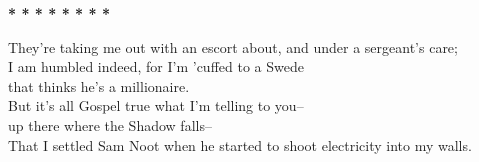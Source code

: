 \begin{poemblock}
\centerline{\textbf{*   *   *   *   *   *   *   *}}

They're taking me out with an escort about, and under a sergeant's care;\\
I am humbled indeed, for I'm 'cuffed to a Swede\\
\idt that thinks he's a millionaire.\\
But it's all Gospel true what I'm telling to you--\\
\idt up there where the Shadow falls--\\
That I settled Sam Noot when he started to shoot electricity into my walls.
\end{poemblock}
